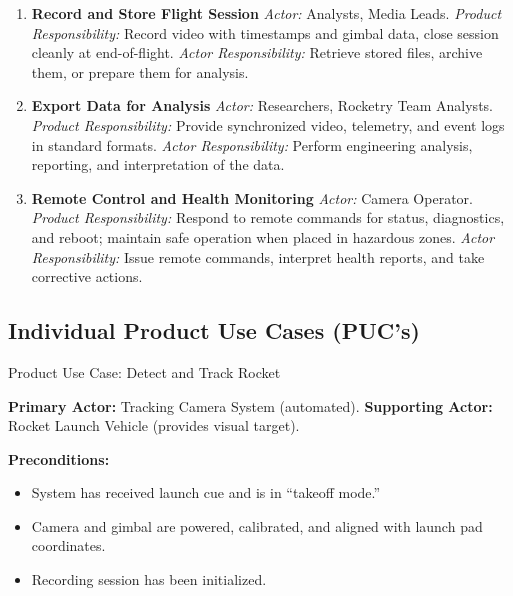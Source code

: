 \documentclass[12pt]{article}
\begin{document}
\begin{enumerate}[wide=0pt, leftmargin=*]
  \item \textbf{Record and Store Flight Session}
        \emph{Actor:} Analysts, Media Leads.
        \emph{Product Responsibility:} Record video with timestamps and gimbal
        data, close session cleanly at end-of-flight.
        \emph{Actor Responsibility:} Retrieve stored files, archive them, or
        prepare them for analysis.

  \item \textbf{Export Data for Analysis}
        \emph{Actor:} Researchers, Rocketry Team Analysts.
        \emph{Product Responsibility:} Provide synchronized video, telemetry,
        and event logs in standard formats.
        \emph{Actor Responsibility:} Perform engineering analysis, reporting,
        and interpretation of the data.

  \item \textbf{Remote Control and Health Monitoring}
        \emph{Actor:} Camera Operator.
        \emph{Product Responsibility:} Respond to remote commands for status,
        diagnostics, and reboot; maintain safe operation when placed in
        hazardous zones.
        \emph{Actor Responsibility:} Issue remote commands, interpret health
        reports, and take corrective actions.
\end{enumerate}

\subsection{Individual Product Use Cases (PUC's)}

Product Use Case: Detect and Track Rocket

\textbf{Primary Actor:} Tracking Camera System (automated).  
\textbf{Supporting Actor:} Rocket Launch Vehicle (provides visual target).  

\textbf{Preconditions:}
\begin{itemize}
  \item System has received launch cue and is in ``takeoff mode.''
  \item Camera and gimbal are powered, calibrated, and aligned with launch pad coordinates.
  \item Recording session has been initialized.
\end{itemize}
\end{document}
